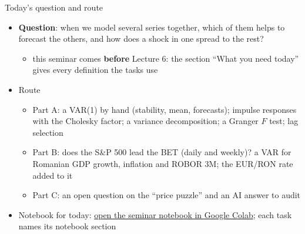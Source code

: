 \begin{frame}{Today's question and route}
\itemsize{\small}
\begin{itemize}
    \item \textbf{Question}: when we model several series together, which of them helps to forecast the others, and how does a shock in one spread to the rest?
    \begin{itemize}
        \item this seminar comes \textbf{before} Lecture 6: the section ``What you need today'' gives every definition the tasks use
    \end{itemize}
    \item Route
    \begin{itemize}
        \item Part A: a VAR(1) by hand (stability, mean, forecasts); impulse responses with the Cholesky factor; a variance decomposition; a Granger $F$ test; lag selection
        \item Part B: does the S\&P 500 lead the BET (daily and weekly)? a VAR for Romanian GDP growth, inflation and ROBOR 3M; the EUR/RON rate added to it
        \item Part C: an open question on the ``price puzzle'' and an AI answer to audit
    \end{itemize}
    \item Notebook for today: \href{\nb}{open the seminar notebook in Google Colab}; each task names its notebook section
\end{itemize}
\end{frame}

